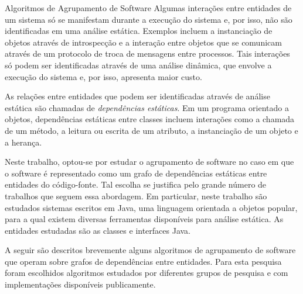 \begin{section}{Algoritmos de Agrupamento de Software}
Algumas interações entre entidades de um sistema só se manifestam durante a execução do sistema e, por isso, não são identificadas em uma análise estática. Exemplos incluem a instanciação de objetos através de introspecção e a interação entre objetos que se comunicam através de um protocolo de troca de mensagens entre processos. Tais interações só podem ser identificadas através de uma análise dinâmica, que envolve a execução do sistema e, por isso, apresenta maior custo.

As relações entre entidades que podem ser identificadas através de análise estática são chamadas de \emph{dependências estáticas}. Em um programa orientado a objetos, dependências estáticas entre classes incluem interações como a chamada de um método, a leitura ou escrita de um atributo, a instanciação de um objeto e a herança.

Neste trabalho, optou-se por estudar o agrupamento de software no caso em que o software é representado como um grafo de dependências estáticas entre entidades do código-fonte. Tal escolha se justifica pelo grande número de trabalhos que seguem essa abordagem. Em particular, neste trabalho são estudados sistemas escritos em Java, uma linguagem orientada a objetos popular, para a qual existem diversas ferramentas disponíveis para análise estática. As entidades estudadas são as classes e interfaces Java.

% 


% 

A seguir são descritos brevemente alguns algoritmos de agrupamento de software que operam sobre grafos de dependências entre entidades. Para esta pesquisa foram escolhidos algoritmos estudados por diferentes grupos de pesquisa e com implementações disponíveis publicamente.


\end{section}
